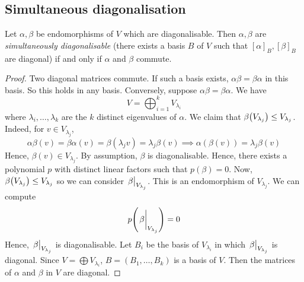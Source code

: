 \subsection{Simultaneous diagonalisation}
\begin{theorem}
	Let \( \alpha, \beta \) be endomorphisms of \( V \) which are diagonalisable.
	Then \( \alpha, \beta \) are \textit{simultaneously diagonalisable} (there exists a basis \( B \) of \( V \) such that \( [\alpha]_B, [\beta]_B \) are diagonal) if and only if \( \alpha \) and \( \beta \) commute.
\end{theorem}
\begin{proof}
	Two diagonal matrices commute.
	If such a basis exists, \( \alpha \beta = \beta \alpha \) in this basis.
	So this holds in any basis.
	Conversely, suppose \( \alpha \beta = \beta \alpha \).
	We have
	\[
		V = \bigoplus_{i=1}^k V_{\lambda_i}
	\]
	where \( \lambda_i, \dots, \lambda_k \) are the \( k \) distinct eigenvalues of \( \alpha \).
	We claim that \( \beta \qty(V_{\lambda_j}) \leq V_{\lambda_j} \).
	Indeed, for \( v \in V_{\lambda_j} \),
	\[
		\alpha \beta(v) = \beta \alpha(v) = \beta(\lambda_j v) = \lambda_j \beta(v) \implies \alpha(\beta(v)) = \lambda_j \beta(v)
	\]
	Hence, \( \beta(v) \in V_{\lambda_j} \).
	By assumption, \( \beta \) is diagonalisable.
	Hence, there exists a polynomial \( p \) with distinct linear factors such that \( p(\beta) = 0 \).
	Now, \( \beta\qty(V_{\lambda_j}) \leq V_{\lambda_j} \) so we can consider \( \eval{\beta}_{V_{\lambda_j}} \).
	This is an endomorphism of \( V_{\lambda_j} \).
	We can compute
	\[
		p\qty(\eval{\beta}_{V_{\lambda_j}}) = 0
	\]
	Hence, \( \eval{\beta}_{V_{\lambda_j}} \) is diagonalisable.
	Let \( B_i \) be the basis of \( V_{\lambda_i} \) in which \( \eval{\beta}_{V_{\lambda_j}} \) is diagonal.
	Since \( V = \bigoplus V_{\lambda_i} \), \( B = (B_1, \dots, B_k) \) is a basis of \( V \).
	Then the matrices of \( \alpha \) and \( \beta \) in \( V \) are diagonal.
\end{proof}

